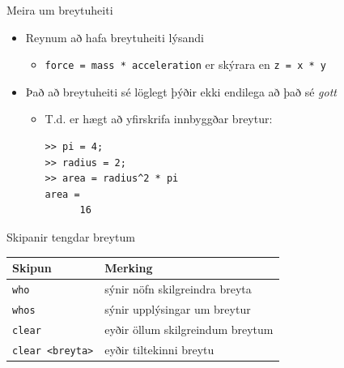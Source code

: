 \documentclass{beamer}
\begin{document}
\begin{frame}[fragile]{Meira um breytuheiti}
\begin{itemize}
 \item Reynum að hafa breytuheiti lýsandi
 \begin{itemize}
  \item \texttt{force = mass * acceleration} er skýrara en \texttt{z = x * y} 
 \end{itemize}
 \item Það að breytuheiti sé löglegt þýðir ekki endilega að það sé \emph{gott}
 \begin{itemize}
  \item T.d. er hægt að yfirskrifa innbyggðar breytur:
\begin{verbatim}
>> pi = 4;
>> radius = 2;
>> area = radius^2 * pi
area = 
      16
\end{verbatim}
 \end{itemize}
\end{itemize}
\end{frame}

\begin{frame}{Skipanir tengdar breytum}
\begin{center}
\begin{tabular}{ll}
\toprule
Skipun&Merking\\
\midrule
\texttt{who}&sýnir nöfn skilgreindra breyta\\
\texttt{whos}&sýnir upplýsingar um breytur\\
\texttt{clear}&eyðir öllum skilgreindum breytum\\
\texttt{clear <breyta>}&eyðir tiltekinni breytu\\
\bottomrule
\end{tabular}
\end{center}
\end{frame}
\end{document}
